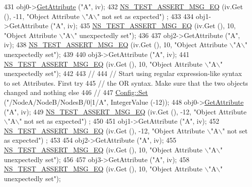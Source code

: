 \begin{DoxyCode}
431   obj0->\hyperlink{classns3_1_1ObjectBase_a895d1de2f96063d0e0fd78463e7a7e30}{GetAttribute} (\textcolor{stringliteral}{"A"}, iv);
432   \hyperlink{group__testing_ga2a9d78cffb3db8e867c35fff0b698cf5}{NS\_TEST\_ASSERT\_MSG\_EQ} (iv.Get (), -11, \textcolor{stringliteral}{"Object Attribute \(\backslash\)"A\(\backslash\)" not set as expected"})
      ;
433 
434   obj1->GetAttribute (\textcolor{stringliteral}{"A"}, iv);
435   \hyperlink{group__testing_ga2a9d78cffb3db8e867c35fff0b698cf5}{NS\_TEST\_ASSERT\_MSG\_EQ} (iv.Get (), 10, \textcolor{stringliteral}{"Object Attribute \(\backslash\)"A\(\backslash\)" unexpectedly set"});
436 
437   obj2->GetAttribute (\textcolor{stringliteral}{"A"}, iv);
438   \hyperlink{group__testing_ga2a9d78cffb3db8e867c35fff0b698cf5}{NS\_TEST\_ASSERT\_MSG\_EQ} (iv.Get (), 10, \textcolor{stringliteral}{"Object Attribute \(\backslash\)"A\(\backslash\)" unexpectedly set"});
439 
440   obj3->GetAttribute (\textcolor{stringliteral}{"A"}, iv);
441   \hyperlink{group__testing_ga2a9d78cffb3db8e867c35fff0b698cf5}{NS\_TEST\_ASSERT\_MSG\_EQ} (iv.Get (), 10, \textcolor{stringliteral}{"Object Attribute \(\backslash\)"A\(\backslash\)" unexpectedly set"});
442 
443   \textcolor{comment}{//}
444   \textcolor{comment}{// Start using regular expression-like syntax to set Attributes.  First try}
445   \textcolor{comment}{// the OR syntax.  Make sure that the two objects changed and nothing else}
446   \textcolor{comment}{//}
447   \hyperlink{group__config_gadce03667ec621d64ce4aace85d9bcfd0}{Config::Set} (\textcolor{stringliteral}{"/NodeA/NodeB/NodesB/0|1/A"}, IntegerValue (-12));
448   obj0->\hyperlink{classns3_1_1ObjectBase_a895d1de2f96063d0e0fd78463e7a7e30}{GetAttribute} (\textcolor{stringliteral}{"A"}, iv);
449   \hyperlink{group__testing_ga2a9d78cffb3db8e867c35fff0b698cf5}{NS\_TEST\_ASSERT\_MSG\_EQ} (iv.Get (), -12, \textcolor{stringliteral}{"Object Attribute \(\backslash\)"A\(\backslash\)" not set as expected"})
      ;
450 
451   obj1->GetAttribute (\textcolor{stringliteral}{"A"}, iv);
452   \hyperlink{group__testing_ga2a9d78cffb3db8e867c35fff0b698cf5}{NS\_TEST\_ASSERT\_MSG\_EQ} (iv.Get (), -12, \textcolor{stringliteral}{"Object Attribute \(\backslash\)"A\(\backslash\)" not set as expected"})
      ;
453 
454   obj2->GetAttribute (\textcolor{stringliteral}{"A"}, iv);
455   \hyperlink{group__testing_ga2a9d78cffb3db8e867c35fff0b698cf5}{NS\_TEST\_ASSERT\_MSG\_EQ} (iv.Get (), 10, \textcolor{stringliteral}{"Object Attribute \(\backslash\)"A\(\backslash\)" unexpectedly set"});
456 
457   obj3->GetAttribute (\textcolor{stringliteral}{"A"}, iv);
458   \hyperlink{group__testing_ga2a9d78cffb3db8e867c35fff0b698cf5}{NS\_TEST\_ASSERT\_MSG\_EQ} (iv.Get (), 10, \textcolor{stringliteral}{"Object Attribute \(\backslash\)"A\(\backslash\)" unexpectedly set"});

\end{DoxyCode}

